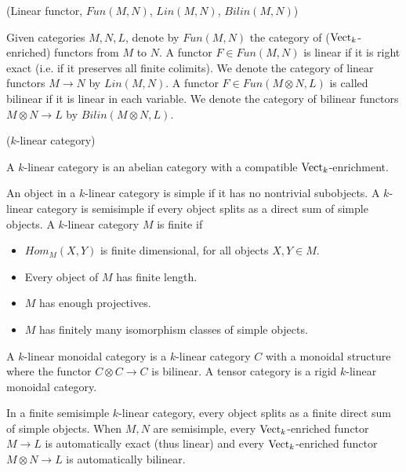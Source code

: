 \begin{definition} (Linear functor, $Fun(M,N)$, $Lin(M,N)$, $Bilin(M,N)$)

  \noindent Given categories $M, N, L$, denote by $Fun(M,N)$ the category of
  ($\operatorname{Vect}_k$-enriched) functors from $M$ to $N$. A functor $F \in Fun(M,N)$ is
  linear if it is right exact (i.e. if it preserves all finite colimits). We
  denote the category of linear functors $M \to N$ by $Lin(M,N)$. A functor
  $F \in Fun(M \otimes N, L)$ is called bilinear if it is linear in each
  variable. We denote the category of bilinear functors $M\otimes N \to L$ by
  $Bilin(M\otimes N, L)$.
\end{definition}

\begin{definition} \label{definition/k-linear-category} ($k$-linear category) \cite{douglas/balanced-product}

\noindent A $k$-linear category is an abelian category with a compatible $\operatorname{Vect}_{k}$-enrichment.
\end{definition}

\begin{definition} \cite{egno/tensor-cats}
  An object in a $k$-linear category is simple if it has no nontrivial
  subobjects. A $k$-linear category is semisimple if every object splits as a
  direct sum of simple objects. A $k$-linear category $M$ is finite if

  \begin{itemize}
    \item $Hom_M(X,Y)$ is finite dimensional, for all objects $X,Y\in M$.
    \item Every object of $M$ has finite length.
    \item $M$ has enough projectives.
    \item $M$ has finitely many isomorphism classes of simple objects.
  \end{itemize}
  A $k$-linear monoidal category is a $k$-linear category $C$ with a monoidal
  structure where the functor $C\otimes C\to C$ is bilinear. A tensor category
  is a rigid $k$-linear monoidal category.
\end{definition}

\noindent In a finite semisimple $k$-linear category, every object splits as a
finite direct sum of simple objects. When $M,N$ are semisimple, every
$\operatorname{Vect}_{k}$-enriched functor $M\to L$ is automatically exact (thus linear) and
every $\operatorname{Vect}_{k}$-enriched functor $M\otimes N\to L$ is automatically
bilinear.

